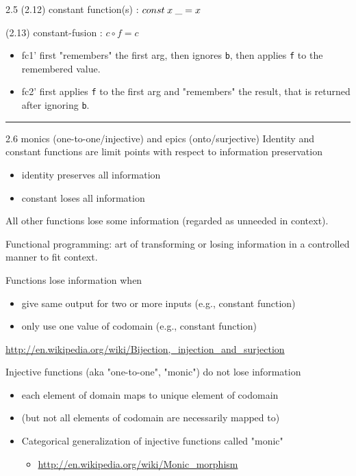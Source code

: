 \documentclass[presentation]{beamer}
\begin{document}
\begin{frame}[fragile,label=sec-4]{2.5  (2.12) constant function(s) : $const \hspace{0.25em} x \hspace{0.25em} \_ =  x$}
\begin{block}{(2.13) constant-fusion : $c \circ f = c$}
\begin{itemize}
\item fc1' first "remembers" the first arg, then ignores \texttt{b}, then applies \texttt{f} to the remembered value.
\item fc2' first applies \texttt{f} to the first arg and "remembers" the result, that is returned after ignoring \texttt{b}.
\end{itemize}

\rule{\linewidth}{0.5pt}
\end{block}
\end{frame}
\begin{frame}[fragile,label=sec-5]{2.6 monics (one-to-one/injective) and epics (onto/surjective)}
 Identity and constant functions are limit points with respect to information preservation
\begin{itemize}
\item identity preserves all information
\item constant loses all information
\end{itemize}

All other functions lose some information (regarded as unneeded in context).

Functional programming: art of transforming or losing information in a controlled manner to fit context.

Functions lose information when
\begin{itemize}
\item give same output for two or more inputs (e.g., constant function)
\item only use one value of codomain (e.g., constant function)
\end{itemize}

\url{http://en.wikipedia.org/wiki/Bijection,_injection_and_surjection}

Injective functions (aka "one-to-one", "monic") do not lose information
\begin{itemize}
\item each element of domain maps to unique element of codomain
\item (but not all elements of codomain are necessarily mapped to)
\item Categorical generalization of injective functions called "monic"
\begin{itemize}
\item \url{http://en.wikipedia.org/wiki/Monic_morphism}
\end{itemize}
\end{itemize}


\end{frame}
\end{document}
